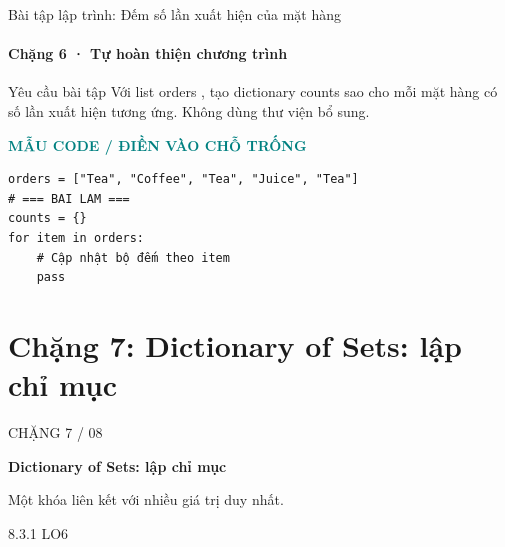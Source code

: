 \documentclass[aspectratio=169,10pt]{beamer}
\begin{document}
\begin{frame}[fragile,t]{Bài tập lập trình: Đếm số lần xuất hiện của mặt hàng}
\framesubtitle{Chặng 6 · Tự hoàn thiện chương trình}
\begin{block}{Yêu cầu bài tập}
Với list orders , tạo dictionary counts sao cho mỗi mặt hàng có số lần xuất hiện tương ứng. Không dùng thư viện bổ sung.
\end{block}
\textcolor{teal}{\scriptsize\textbf{MẪU CODE / ĐIỀN VÀO CHỖ TRỐNG}}\par
\begin{Verbatim}[fontsize=\scriptsize,frame=single,framesep=3mm,rulecolor=\color{teal!35},breaklines=true]
orders = ["Tea", "Coffee", "Tea", "Juice", "Tea"]
# === BAI LAM ===
counts = {}
for item in orders:
    # Cập nhật bộ đếm theo item
    pass
\end{Verbatim}
\end{frame}

\section{Chặng 7: Dictionary of Sets: lập chỉ mục}

\begin{frame}[plain]
\vfill
{\color{white!65}\Large CHẶNG 7 / 08}\par\medskip
{\color{white}\fontsize{26}{30}\selectfont\bfseries Dictionary of Sets: lập chỉ mục}\par\bigskip
{\color{white!80}\large Một khóa liên kết với nhiều giá trị duy nhất.}\par\medskip
{\color{white!80}\normalsize 8.3.1 \hspace{1.2cm} LO6}
\vfill
\end{frame}
\end{document}
